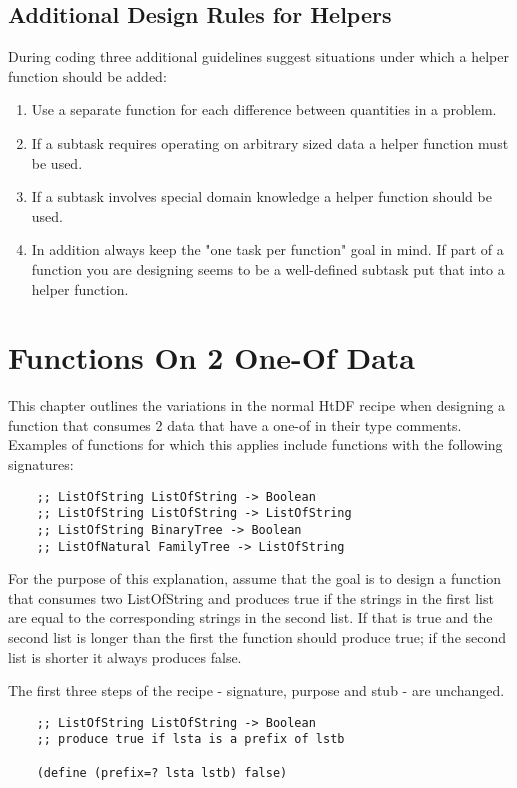 \documentclass[11pt,a4paper]{report}
\begin{document}
	\section{Additional Design Rules for Helpers}
	During coding three additional guidelines suggest situations under which a helper function should
	be added:
	\begin{enumerate}
		\item Use a separate function for each difference between quantities in a problem.
		\item If a subtask requires operating on arbitrary sized data a helper function must be used.
		\item If a subtask involves special domain knowledge a helper function should be used.
		\item In addition always keep the "one task per function" goal in mind. If part of a function you are
		designing seems to be a well-defined subtask put that into a helper function.
	\end{enumerate}

	\chapter{Functions On 2 One-Of Data} \label{ch:fun_2_1_of_data}
	This chapter outlines the variations in the normal HtDF recipe when designing a function that
	consumes 2 data that have a one-of in their type comments. Examples of functions for which this
	applies include functions with the following signatures:
	\begin{verbatim}
	;; ListOfString ListOfString -> Boolean
	;; ListOfString ListOfString -> ListOfString
	;; ListOfString BinaryTree -> Boolean
	;; ListOfNatural FamilyTree -> ListOfString
	\end{verbatim}
	
	For the purpose of this explanation, assume that the goal is to design a function that consumes
	two ListOfString and produces true if the strings in the first list are equal to the corresponding
	strings in the second list. If that is true and the second list is longer than the first the function
	should produce true; if the second list is shorter it always produces false.
	
	The first three steps of the recipe - signature, purpose and stub - are unchanged.
	
	\begin{verbatim}
	;; ListOfString ListOfString -> Boolean
	;; produce true if lsta is a prefix of lstb
	
	(define (prefix=? lsta lstb) false)
	\end{verbatim}
	
\end{document}
